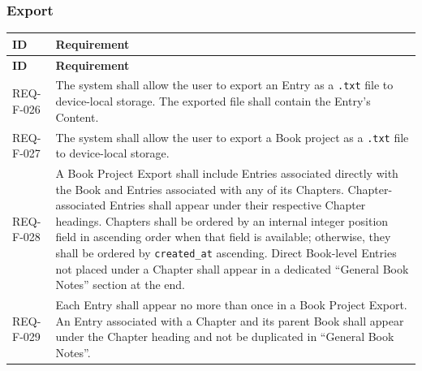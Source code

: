 \documentclass[11pt,a4paper]{article}
\begin{document}
\subsubsection{Export}
\begin{longtable}{|L{2.2cm}|L{13.6cm}|}
\hline \textbf{ID} & \textbf{Requirement} \\
\hline
\endfirsthead
\hline \textbf{ID} & \textbf{Requirement} \\
\hline
\endhead
REQ-F-026 & The system shall allow the user to export an Entry as a \texttt{.txt} file to device-local storage. The exported file shall contain the Entry's Content. \\ \hline
REQ-F-027 & The system shall allow the user to export a Book project as a \texttt{.txt} file to device-local storage. \\ \hline
REQ-F-028 & A Book Project Export shall include Entries associated directly with the Book and Entries associated with any of its Chapters. Chapter-associated Entries shall appear under their respective Chapter headings. Chapters shall be ordered by an internal integer position field in ascending order when that field is available; otherwise, they shall be ordered by \texttt{created\_at} ascending. Direct Book-level Entries not placed under a Chapter shall appear in a dedicated ``General Book Notes'' section at the end. \\ \hline
REQ-F-029 & Each Entry shall appear no more than once in a Book Project Export. An Entry associated with a Chapter and its parent Book shall appear under the Chapter heading and not be duplicated in ``General Book Notes''. \\ \hline
\end{longtable}
\end{document}
